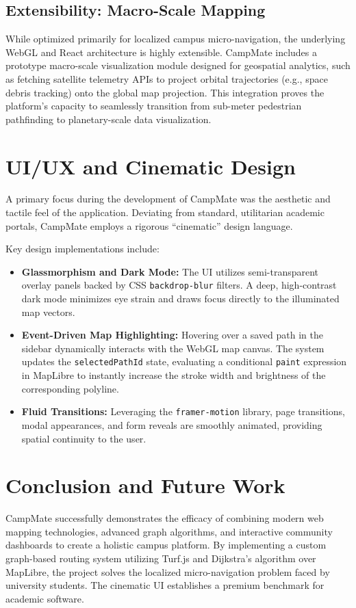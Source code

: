 \documentclass[conference]{IEEEtran}
\begin{document}
\subsection{Extensibility: Macro-Scale Mapping}
While optimized primarily for localized campus micro-navigation, the underlying WebGL and React architecture is highly extensible. CampMate includes a prototype macro-scale visualization module designed for geospatial analytics, such as fetching satellite telemetry APIs to project orbital trajectories (e.g., space debris tracking) onto the global map projection. This integration proves the platform's capacity to seamlessly transition from sub-meter pedestrian pathfinding to planetary-scale data visualization.

\section{UI/UX and Cinematic Design}
A primary focus during the development of CampMate was the aesthetic and tactile feel of the application. Deviating from standard, utilitarian academic portals, CampMate employs a rigorous ``cinematic'' design language.

Key design implementations include:
\begin{itemize}
    \item \textbf{Glassmorphism and Dark Mode:} The UI utilizes semi-transparent overlay panels backed by CSS \texttt{backdrop-blur} filters. A deep, high-contrast dark mode minimizes eye strain and draws focus directly to the illuminated map vectors.
    \item \textbf{Event-Driven Map Highlighting:} Hovering over a saved path in the sidebar dynamically interacts with the WebGL map canvas. The system updates the \texttt{selectedPathId} state, evaluating a conditional \texttt{paint} expression in MapLibre to instantly increase the stroke width and brightness of the corresponding polyline.
    \item \textbf{Fluid Transitions:} Leveraging the \texttt{framer-motion} library, page transitions, modal appearances, and form reveals are smoothly animated, providing spatial continuity to the user.
\end{itemize}

\section{Conclusion and Future Work}
CampMate successfully demonstrates the efficacy of combining modern web mapping technologies, advanced graph algorithms, and interactive community dashboards to create a holistic campus platform. By implementing a custom graph-based routing system utilizing Turf.js and Dijkstra's algorithm over MapLibre, the project solves the localized micro-navigation problem faced by university students. The cinematic UI establishes a premium benchmark for academic software.
\end{document}
